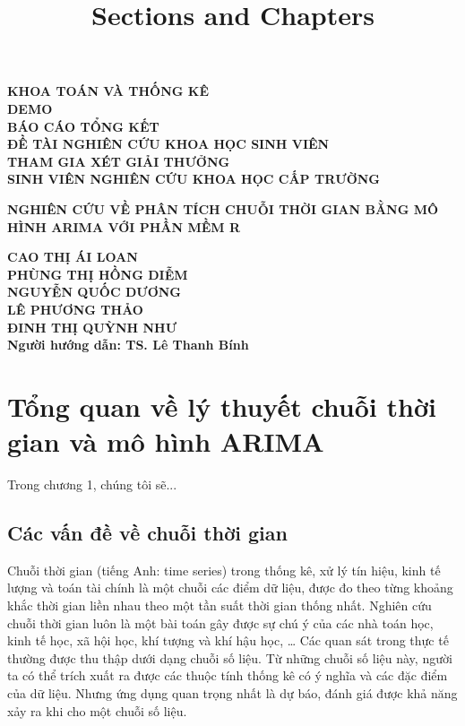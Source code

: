 \documentclass[12pt, a4paper,oneside]{book}
\title{Sections and Chapters}
\theoremstyle{definition}
\begin{document}
\begin{center}
	\textbf{{\normalsize KHOA TOÁN VÀ THỐNG KÊ}}\\
	\vspace{3cm}
	\textbf{{\LARGE DEMO}}\\
	\vspace{2.5cm}
	\textbf{{\normalsize BÁO CÁO TỔNG KẾT\\
			ĐỀ TÀI NGHIÊN CỨU KHOA HỌC SINH VIÊN\\
			THAM GIA XÉT GIẢI THƯỞNG\\
			SINH VIÊN NGHIÊN CỨU KHOA HỌC CẤP TRƯỜNG}}
		
		
		\vspace{2.5cm}
\textbf{{\large NGHIÊN CỨU VỀ PHÂN TÍCH CHUỖI THỜI GIAN BẰNG MÔ HÌNH ARIMA VỚI PHẦN MỀM R}}\\
\vspace{2.5cm}

           \textbf{	{\normalsize CAO THỊ ÁI LOAN\\
           		PHÙNG THỊ HỒNG DIỄM\\
           		NGUYỄN QUỐC DƯƠNG\\      
           		LÊ PHƯƠNG THẢO\\
           		ĐINH THỊ QUỲNH NHƯ}}\\
           \vspace{1cm}
            \textbf{ Người hướng dẫn: TS. Lê Thanh Bính}                 
\end{center}
\tableofcontents
\listoffigures
\listoftables
\chapter{Tổng quan về lý thuyết chuỗi thời gian và mô hình ARIMA}

Trong chương 1, chúng tôi sẽ...

\section{Các vấn đề về chuỗi thời gian}

Chuỗi thời gian (tiếng Anh: time series) trong thống kê, xử lý tín hiệu, kinh tế lượng và toán tài chính là một chuỗi các điểm dữ liệu, được đo theo từng khoảng khắc thời gian liền nhau theo một tần suất thời gian thống nhất. Nghiên cứu chuỗi thời gian luôn là một bài toán gây được sự chú ý của các nhà toán học, kinh tế học, xã hội học, khí tượng và khí hậu học, … Các quan sát trong thực tế thường được thu thập dưới dạng chuỗi số liệu. Từ những chuỗi số liệu này, người ta có thể trích xuất ra được các thuộc tính thống kê có ý nghĩa và các đặc điểm của dữ liệu. Nhưng ứng dụng quan trọng nhất là dự báo, đánh giá được khả năng xảy ra khi cho một chuỗi số liệu. 
\end{document}
